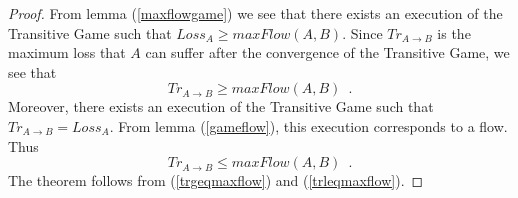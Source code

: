 \begin{proof}%
   From lemma (\ref{maxflowgame}) we see that there exists an execution of the Transitive Game such that
   $Loss_A \geq maxFlow\left(A, B\right)$.
   Since $Tr_{A \rightarrow B}$ is the maximum loss that $A$ can suffer after the convergence of the Transitive Game, we
   see that
   \begin{equation}
   \label{trgeqmaxflow}
      Tr_{A \rightarrow B} \geq maxFlow\left(A, B\right) \enspace.
   \end{equation}
   Moreover, there exists an execution of the Transitive Game such that $Tr_{A \rightarrow B} = Loss_A$.
   From lemma (\ref{gameflow}), this execution corresponds to a flow. Thus
   \begin{equation}
   \label{trleqmaxflow}
      Tr_{A \rightarrow B} \leq maxFlow\left(A, B\right) \enspace.
   \end{equation}
   The theorem follows from (\ref{trgeqmaxflow}) and (\ref{trleqmaxflow}).
\end{proof}
